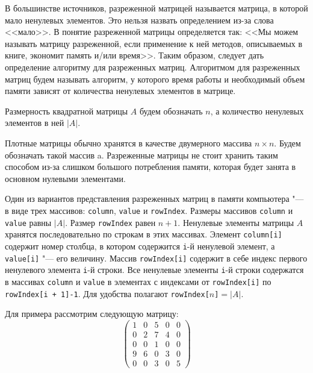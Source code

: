 \documentclass[bachelor, och, coursework]{SCWorks}
\begin{document}
В большинстве источников, разреженной матрицей называется матрица, в которой мало ненулевых элементов. Это нельзя назвать определением из-за слова <<мало>>. В \cite{matrix_87} понятие разреженной матрицы определяется так: <<Мы можем называть матрицу разреженной, если применение к ней методов, описываемых в книге, экономит память и/или время>>. Таким образом, следует дать определение алгоритму для разреженных матриц. Алгоритмом для разреженных матриц будем называть алгоритм, у которого время работы и необходимый объем памяти зависят от количества ненулевых элементов в матрице.

Размерность квадратной матрицы $A$ будем обозначать $n$, а количество ненулевых элементов в ней $|A|$.

Плотные матрицы обычно хранятся в качестве двумерного массива $n\times n$. Будем обозначать такой массив a. Разреженные матрицы не стоит хранить таким способом из-за слишком большого потребления памяти, которая будет занята в основном нулевыми элементами.

Один из вариантов представления разреженных матриц в памяти компьютера "--- в виде трех массивов: \verb"column", \verb"value" и \verb"rowIndex". Размеры массивов \verb"column" и \verb"value" равны $|A|$. Размер \verb"rowIndex" равен $n+1$. Ненулевые элементы матрицы $A$ хранятся последовательно по строкам в этих массивах. Элемент \verb"column[i]" содержит номер столбца, в котором содержится \verb"i"-й ненулевой элемент, а \verb"value[i]" "--- его величину. Массив \verb"rowIndex[i]" содержит в себе индекс первого ненулевого элемента \verb"i"-й строки. Все ненулевые элементы \verb"i"-й строки содержатся в массивах \verb"column" и \verb"value" в элементах с индексами от \verb"rowIndex[i]" по \verb"rowIndex[i + 1]-1". Для удобства полагают \verb"rowIndex["$n$\verb"]"$=|A|$.

Для примера рассмотрим следующую матрицу:
\[
    \left(
    \begin{matrix}
        1 & 0 & 5 & 0 & 0 \\
        0 & 2 & 7 & 4 & 0 \\
        0 & 0 & 1 & 0 & 0 \\
        9 & 6 & 0 & 3 & 0 \\
        0 & 0 & 3 & 0 & 5
    \end{matrix}
    \right)
\]
\end{document}
